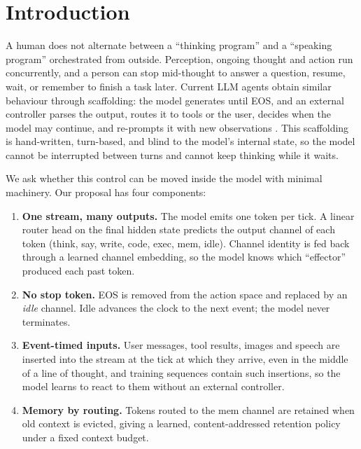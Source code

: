 \documentclass[10pt]{article}
\begin{document}
\begin{abstract}
on context eviction had no effect when old information was not needed, but when revisions arrived after the original request had been evicted it raised correct revisions from \longfarrouterplainrevise\% to \longfarroutermemrevise\%, and to \longfarlfroutermemrevise\% after long-gap episodes were added to training. With Qwen3-1.7B and Qwen3-4B (LoRA), all arms improved under heavy load, the router no longer exceeded tags (at 4B tags was slightly better), while the orchestrator's deficit on deadline-bound requests remained (4B: \scquickbig\,pp). These synthetic results, at up to 4B parameters, show that output routing, waiting and interruption handling can be learned inside the model rather than hard-coded around it; they do not show benefits on natural tasks or at frontier scale.
\end{abstract}

\section{Introduction}
A human does not alternate between a ``thinking program'' and a ``speaking program'' orchestrated from outside. Perception, ongoing thought and action run concurrently, and a person can stop mid-thought to answer a question, resume, wait, or remember to finish a task later. Current LLM agents obtain similar behaviour through scaffolding: the model generates until EOS, and an external controller parses the output, routes it to tools or the user, decides when the model may continue, and re-prompts it with new observations \citep{yao2022react,schick2023toolformer,packer2023memgpt}. This scaffolding is hand-written, turn-based, and blind to the model's internal state, so the model cannot be interrupted between turns and cannot keep thinking while it waits.

We ask whether this control can be moved inside the model with minimal machinery. Our proposal has four components:
\begin{enumerate}\itemsep0pt
\item \textbf{One stream, many outputs.} The model emits one token per tick. A linear router head on the final hidden state predicts the output channel of each token (think, say, write, code, exec, mem, idle). Channel identity is fed back through a learned channel embedding, so the model knows which ``effector'' produced each past token.
\item \textbf{No stop token.} EOS is removed from the action space and replaced by an \emph{idle} channel. Idle advances the clock to the next event; the model never terminates.
\item \textbf{Event-timed inputs.} User messages, tool results, images and speech are inserted into the stream at the tick at which they arrive, even in the middle of a line of thought, and training sequences contain such insertions, so the model learns to react to them without an external controller.
\item \textbf{Memory by routing.} Tokens routed to the mem channel are retained when old context is evicted, giving a learned, content-addressed retention policy under a fixed context budget.
\end{enumerate}
\end{document}
